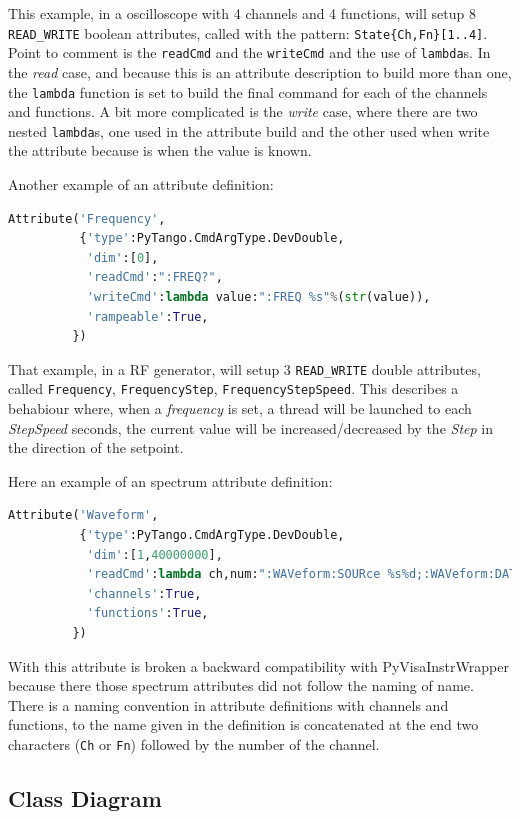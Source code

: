 \documentclass[a4paper,10pt]{article}
\begin{document}
This example, in a oscilloscope with 4 channels and 4 functions, will setup 8 {\tt READ\_WRITE} boolean attributes, called with the pattern: {\tt State\{Ch,Fn\}[1..4]}. Point to comment is the {\tt readCmd} and the {\tt writeCmd} and the use of {\tt lambda}s. In the \emph{read} case, and because this is an attribute description to build more than one, the {\tt lambda} function is set to build the final command for each of the channels and functions. A bit more complicated is the \emph{write} case, where there are two nested {\tt lambda}s, one used in the attribute build and the other used when write the attribute because is when the value is known.

Another example of an attribute definition:

\begin{lstlisting}[language=python,basicstyle=\footnotesize]
Attribute('Frequency',
          {'type':PyTango.CmdArgType.DevDouble,
           'dim':[0],
           'readCmd':":FREQ?",
           'writeCmd':lambda value:":FREQ %s"%(str(value)),
           'rampeable':True,
         })
\end{lstlisting}

That example, in a RF generator, will setup 3 {\tt READ\_WRITE} double attributes, called {\tt Frequency}, {\tt FrequencyStep}, {\tt FrequencyStepSpeed}. This describes a behabiour where, when a \emph{frequency} is set, a thread will be launched to each \emph{StepSpeed} seconds, the current value will be increased/decreased by the \emph{Step} in the direction of the setpoint.

Here an example of an spectrum attribute definition:

\begin{lstlisting}[language=python,basicstyle=\footnotesize]
Attribute('Waveform',
          {'type':PyTango.CmdArgType.DevDouble,
           'dim':[1,40000000],
           'readCmd':lambda ch,num:":WAVeform:SOURce %s%d;:WAVeform:DATA?"%(ch,num),
           'channels':True,
           'functions':True,
         })
\end{lstlisting}

With this attribute is broken a backward compatibility with PyVisaInstrWrapper because there those spectrum attributes did not follow the naming of name. There is a naming convention in attribute definitions with channels and functions, to the name given in the definition is concatenated at the end two characters ({\tt Ch} or {\tt Fn}) followed by the number of the channel.

\subsection{Class Diagram}
\end{document}
